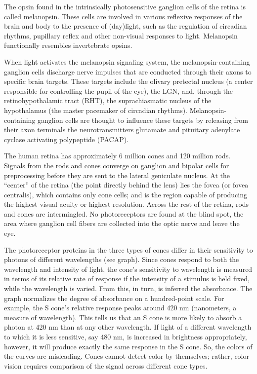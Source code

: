 The opsin found in the intrinsically photosensitive ganglion cells of the retina is called melanopsin. These cells are involved in various reflexive responses of the brain and body to the presence of (day)light, such as the regulation of circadian rhythms, pupillary reflex and other non-visual responses to light. Melanopsin functionally resembles invertebrate opsins.

When light activates the melanopsin signaling system, the melanopsin-containing ganglion cells discharge nerve impulses that are conducted through their axons to specific brain targets. These targets include the olivary pretectal nucleus (a center responsible for controlling the pupil of the eye), the LGN, and, through the retinohypothalamic tract (RHT), the suprachiasmatic nucleus of the hypothalamus (the master pacemaker of circadian rhythms). Melanopsin-containing ganglion cells are thought to influence these targets by releasing from their axon terminals the neurotransmitters glutamate and pituitary adenylate cyclase activating polypeptide (PACAP).

The human retina has approximately 6 million cones and 120 million rods. Signals from the rods and cones converge on ganglion and bipolar cells for preprocessing before they are sent to the lateral geniculate nucleus. At the ``center'' of the retina (the point directly behind the lens) lies the fovea (or fovea centralis), which contains only cone cells; and is the region capable of producing the highest visual acuity or highest resolution. Across the rest of the retina, rods and cones are intermingled. No photoreceptors are found at the blind spot, the area where ganglion cell fibers are collected into the optic nerve and leave the eye.

The photoreceptor proteins in the three types of cones differ in their sensitivity to photons of different wavelengths (see graph). Since cones respond to both the wavelength and intensity of light, the cone's sensitivity to wavelength is measured in terms of its relative rate of response if the intensity of a stimulus is held fixed, while the wavelength is varied. From this, in turn, is inferred the absorbance. The graph normalizes the degree of absorbance on a hundred-point scale. For example, the S cone's relative response peaks around 420 nm (nanometers, a measure of wavelength). This tells us that an S cone is more likely to absorb a photon at 420 nm than at any other wavelength. If light of a different wavelength to which it is less sensitive, say 480 nm, is increased in brightness appropriately, however, it will produce exactly the same response in the S cone. So, the colors of the curves are misleading. Cones cannot detect color by themselves; rather, color vision requires comparison of the signal across different cone types.

